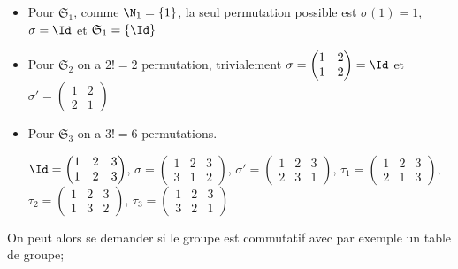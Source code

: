 \begin{ex}
\begin{itemize}
\item Pour $\mathfrak{S}_1$, comme $\N_1=\{1\}$, la seul permutation possible est $\sigma(1)=1$, $\sigma=\Id$ et $\mathfrak{S}_1=\{\Id\}$
\item Pour $\mathfrak{S}_2$ on a $2!=2$ permutation, trivialement $\sigma=\begin{pmatrix}
    1 & 2  \\
    1 & 2  
\end{pmatrix}=\Id$ et $\sigma'=\begin{pmatrix}
1 & 2  \\
2 & 1 
\end{pmatrix}$\\
\item Pour $\mathfrak{S}_3$ on a $3!=6$ permutations.

$\Id=\begin{pmatrix}
1 & 2 & 3  \\
1 & 2 & 3 
\end{pmatrix}$, $\sigma=\begin{pmatrix}
1 & 2 & 3  \\
3 & 1 & 2 
\end{pmatrix}$, $\sigma'=\begin{pmatrix}
1 & 2 & 3  \\
2 & 3 & 1 
\end{pmatrix}$, $\tau_1=\begin{pmatrix}
1 & 2 & 3  \\
2 & 1 & 3 
\end{pmatrix}$, $\tau_2=\begin{pmatrix}
1 & 2 & 3  \\
1 & 3 & 2 
\end{pmatrix}$, $\tau_3=\begin{pmatrix}
1 & 2 & 3  \\
3 & 2 & 1
\end{pmatrix}$
\end{itemize}
On peut alors se demander si le groupe est commutatif avec par exemple un table de groupe;
\end{ex}

